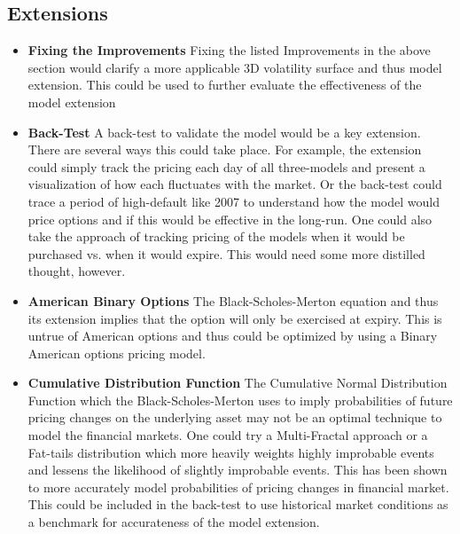 \documentclass{article}
\begin{document}
\subsection{Extensions}
\begin{flushleft} 
\begin{itemize}
  \item \textbf{Fixing the Improvements} \newline
  \tabHorizontal Fixing the listed Improvements in the above section would clarify a more applicable 3D volatility surface and thus model extension. This could be used to further evaluate the effectiveness of the model extension  
  \item \textbf{Back-Test} \newline
  \tabHorizontal A back-test to validate the model would be a key extension. There are several ways this could take place. For example, the extension could simply track the pricing each day of all three-models and present a visualization of how each fluctuates with the market. Or the back-test could trace a period of high-default like 2007 to understand how the model would price options and if this would be effective in the long-run. One could also take the approach of tracking pricing of the models when it would be purchased vs. when it would expire. This would need some more distilled thought, however. 
  \item \textbf{American Binary Options} \newline
  \tabHorizontal The Black-Scholes-Merton equation and thus its extension implies that the option will only be exercised at expiry. This is untrue of American options and thus could be optimized by using a Binary American options pricing model. 
  \item \textbf{Cumulative Distribution Function} \newline
  \tabHorizontal The Cumulative Normal Distribution Function which the Black-Scholes-Merton uses to imply probabilities of future pricing changes on the underlying asset may not be an optimal technique to model the financial markets. One could try a Multi-Fractal approach or a Fat-tails distribution which more heavily weights highly improbable events and lessens the likelihood of slightly improbable events. This has been shown to more accurately model probabilities of pricing changes in financial market. This could be included in the back-test to use historical market conditions as a benchmark for accurateness of the model extension. 
\end{itemize}
\end{flushleft}
\end{document}
